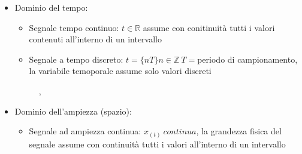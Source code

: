         \begin{itemize}
            \item {Dominio del tempo:
                    \begin{itemize}
                        \item{Segnale tempo continuo: $t \in \mathbb{R}$ assume con conitinuità tutti i valori contenuti all'interno di un intervallo}
                        \item {Segnale a tempo discreto: $t = \{ nT \} n \in \mathbb{Z} \ T=$periodo di campionamento, la variabile temoporale assume solo valori discreti}
                    \end{itemize}
                    \begin{figure}[h]
                        \centering
                        \caption{\color{purple}{tempo continuo}, \color{blue}{tempo discreto:$T=0.3$}}
                        \label{fig:Dominio del tempo}
                    \end{figure}                        
            }
            \item {Dominio dell'ampiezza (spazio):
                    \begin{itemize}
                        \item{Segnale ad ampiezza continua: $x_{(t)}\ continua$, la grandezza fisica del segnale assume con continuità tutti i valori all'interno di un intervallo}

\end{itemize}}
\end{itemize}
